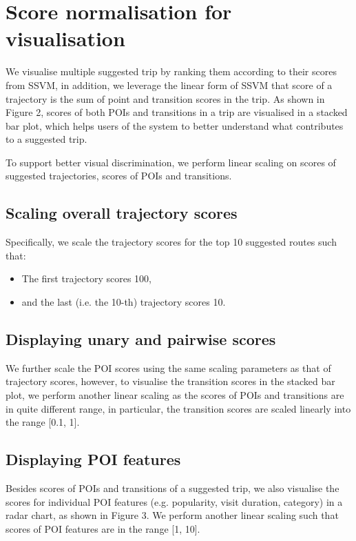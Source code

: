 \documentclass[sigconf]{acmart}
\newcommand{\TODO}[1]{\textcolor{red}{\bf{#1}}}
\begin{document}
\section{Score normalisation for visualisation}
\label{sec:scorenorm}


We visualise multiple suggested trip by ranking them according to their scores from SSVM, in addition,
we leverage the linear form of SSVM that score of a trajectory is the sum of point and transition scores in the trip.
As shown in Figure 2, scores of both POIs and transitions in a trip are visualised in a stacked bar plot,
which helps users of the system to better understand what contributes to a suggested trip.

To support better visual discrimination, we perform linear scaling on scores of suggested trajectories, scores of POIs and transitions.



\subsection{Scaling overall trajectory scores}
Specifically, we scale the trajectory scores for the top 10 suggested routes such that:
\begin{itemize}
\item The first trajectory scores 100,
\item and the last (i.e. the 10-th) trajectory scores 10.
\end{itemize}

\subsection{Displaying unary and pairwise scores}
We further scale the POI scores using the same scaling parameters as that of trajectory scores, however, 
to visualise the transition scores in the stacked bar plot,
we perform another linear scaling as the scores of POIs and transitions are in quite different range,
in particular, the transition scores are scaled linearly into the range [0.1, 1].

\subsection{Displaying POI features}
Besides scores of POIs and transitions of a suggested trip, we also visualise the scores for individual 
POI features (e.g. popularity, visit duration, category) in a radar chart, as shown in Figure 3.
We perform another linear scaling such that scores of POI features are in the range [1, 10].
\end{document}
